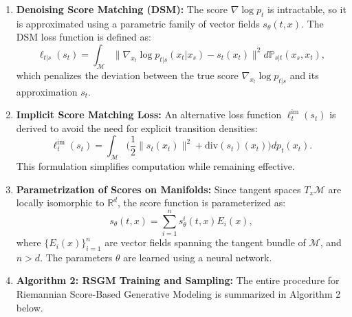 \documentclass[a4paper,14pt]{article}
\theoremstyle{plain} %
\theoremstyle{definition} %
\theoremstyle{remark} %
\theoremstyle{definition}
\theoremstyle{remark}
\theoremstyle{remark}
\begin{document}
	\begin{enumerate}
		\item \textbf{Denoising Score Matching (DSM):}  
		The score \( \nabla \log p_t \) is intractable, so it is approximated using a parametric family of vector fields \( s_\theta(t, x) \). The DSM loss function is defined as:
		\[
		\ell_{t|s}(s_t) = \int_\mathcal{M} \| \nabla_{x_t} \log p_{t|s}(x_t | x_s) - s_t(x_t) \|^2 d\mathbb{P}_{s|t}(x_s, x_t),
		\]
		which penalizes the deviation between the true score \( \nabla_{x_t} \log p_{t|s} \) and its approximation \( s_t \).
		
		\item \textbf{Implicit Score Matching Loss:}  
		An alternative loss function \( \ell_t^{\text{im}}(s_t) \) is derived to avoid the need for explicit transition densities:
		\[
		\ell_t^{\text{im}}(s_t) = \int_\mathcal{M} \bigg( \frac{1}{2} \| s_t(x_t) \|^2 + \text{div}(s_t)(x_t) \bigg) dp_t(x_t).
		\]
		This formulation simplifies computation while remaining effective.
		
		\item \textbf{Parametrization of Scores on Manifolds:}  
		Since tangent spaces \( T_x \mathcal{M} \) are locally isomorphic to \( \mathbb{R}^d \), the score function is parameterized as:
		\[
		s_\theta(t, x) = \sum_{i=1}^n s_\theta^i(t, x) E_i(x),
		\]
		where \( \{ E_i(x) \}_{i=1}^n \) are vector fields spanning the tangent bundle of \( \mathcal{M} \), and \( n > d \). The parameters \( \theta \) are learned using a neural network.
		
		\item \textbf{Algorithm 2: RSGM Training and Sampling:}  
		The entire procedure for Riemannian Score-Based Generative Modeling is summarized in Algorithm 2 below.
		

\end{enumerate}
\end{document}
